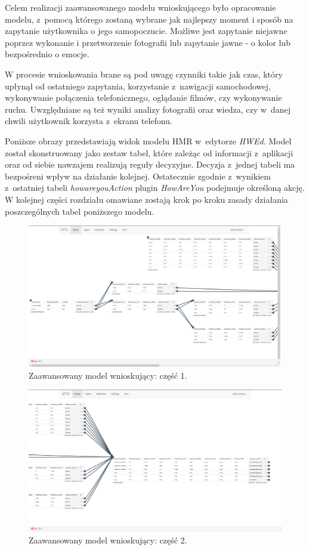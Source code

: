 Celem realizacji zaawansowanego modelu wnioskującego było opracowanie modelu, z~pomocą którego zostaną wybrane jak najlepszy moment i sposób na zapytanie użytkownika o jego samopoczucie. Możliwe jest zapytanie niejawne poprzez wykonanie i przetworzenie fotografii lub zapytanie jawne - o kolor lub bezpośrednio o emocje.

W procesie wnioskowania brane są pod uwagę czynniki takie jak czas, który upłynął od ostatniego zapytania, korzystanie z~nawigacji samochodowej, wykonywanie połączenia telefonicznego, oglądanie filmów, czy wykonywanie ruchu. Uwzględniane są też wyniki analizy fotografii oraz wiedza, czy w~danej chwili użytkownik korzysta z~ekranu telefonu.

Poniższe obrazy przedstawiają widok modelu HMR w~edytorze \textit{HWEd}. Model został skonstruowany jako zestaw tabel, które zależąc od informacji z~aplikacji oraz od siebie nawzajem realizują reguły decyzyjne. Decyzja z~jednej tabeli ma bezpośreni wpływ na działanie kolejnej. Ostatecznie zgodnie z~wynikiem z~ostatniej tabeli \textit{howareyouAction} plugin \textit{HowAreYou} podejmuje określoną akcję. W kolejnej części rozdziału omawiane zostają krok po kroku zasady działania poszczególnych tabel poniższego modelu.

\begin{figure}[H]
	\centering
	\includegraphics[scale=0.75]{rozdzial4/HMR_advancedModelPart1.png}
	\caption{Zaawansowany model wnioskujący: część 1.}
\end{figure}

\begin{figure}[H]
	\centering
	\includegraphics[scale=0.75]{rozdzial4/HMR_advancedModelPart2.png}
	\caption{Zaawansowany model wnioskujący: część 2.}
\end{figure}



